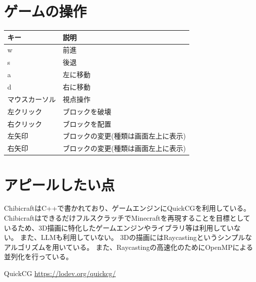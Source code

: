 \documentclass[dvipdfmx]{jsarticle}
\begin{document}
\section{ゲームの操作}
\begin{tabular}{ll}                                         \hline
    キー            & 説明                                  \\ \hline \hline
    w               & 前進                                  \\
    s               & 後退                                  \\
    a               & 左に移動                              \\
    d               & 右に移動                              \\
    マウスカーソル  & 視点操作                              \\
    左クリック      & ブロックを破壊                        \\
    右クリック      & ブロックを配置                        \\
    左矢印          & ブロックの変更(種類は画面左上に表示)  \\
    右矢印          & ブロックの変更(種類は画面左上に表示)  \\ \hline
\end{tabular}

\section{アピールしたい点}
ChibicraftはC++で書かれており、ゲームエンジンにQuickCG\cite{quickcg}を利用している。
ChibicraftはできるだけフルスクラッチでMinecraftを再現することを目標としているため、3D描画に特化したゲームエンジンやライブラリ等は利用していない。
また、LLMも利用していない。
3Dの描画にはRaycastingというシンプルなアルゴリズムを用いている。
また、Raycastingの高速化のためにOpenMPによる並列化を行っている。

\begin{thebibliography}{1}
     QuickCG
    \url{https://lodev.org/quickcg/}
\end{thebibliography}
\end{document}

